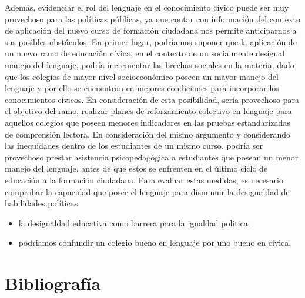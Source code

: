 \documentclass[12pt,twoside]{templates/facsothesis}
\providecommand{\tightlist}{%
  \setlength{\itemsep}{0pt}\setlength{\parskip}{0pt}}
\begin{document}
Además, evidenciar el rol del lenguaje en el conocimiento cívico puede ser muy provechoso para las políticas públicas, ya que contar con información del contexto de aplicación del nuevo curso de formación ciudadana nos permite anticiparnos a sus posibles obstáculos. En primer lugar, podríamos suponer que la aplicación de un nuevo ramo de educación cívica, en el contexto de un socialmente desigual manejo del lenguaje, podría incrementar las brechas sociales en la materia, dado que los colegios de mayor nivel socioeconómico poseen un mayor manejo del lenguaje y por ello se encuentran en mejores condiciones para incorporar los conocimientos cívicos. En consideración de esta posibilidad, seria provechoso para el objetivo del ramo, realizar planes de reforzamiento colectivo en lenguaje para aquellos colegios que poseen menores indicadores en las pruebas estandarizadas de comprensión lectora. En consideración del mismo argumento y considerando las inequidades dentro de los estudiantes de un mismo curso, podría ser provechoso prestar asistencia psicopedagógica a estudiantes que posean un menor manejo del lenguaje, antes de que estos se enfrenten en el último ciclo de educación a la formación ciudadana. Para evaluar estas medidas, es necesario comprobar la capacidad que posee el lenguaje para disminuir la desigualdad de habilidades políticas.

\begin{itemize}
\tightlist
\item
  la desigualdad educativa como barrera para la igualdad politica.
\item
  podriamos confundir un colegio bueno en lenguaje por uno bueno en civica.
\end{itemize}

\hypertarget{bibliografuxeda}{%
\chapter*{Bibliografía}\label{bibliografuxeda}}



\end{document}
